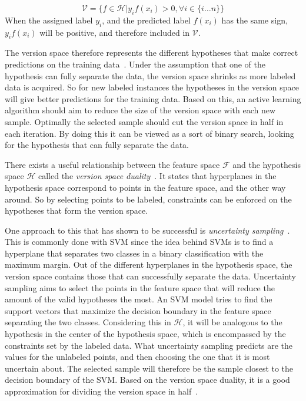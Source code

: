 \begin{equation}\label{eq:version-space}
    \mathcal{V} = \Big \{ f \in \mathcal{H} \Big | y_i f(x_i) > 0, \forall i \in \{i \dots n\} \Big \}
\end{equation}
When the assigned label $y_i$, and the predicted label $f(x_i)$ has the same sign, $y_i f(x_i)$ will be positive, and therefore included in $\mathcal{V}$.

The version space therefore represents the different hypotheses that make correct predictions on the training data~\cite{settles2012active}.
Under the assumption that one of the hypothesis can fully separate the data, the version space shrinks as more labeled data is acquired.
So for new labeled instances the hypotheses in the version space will give better predictions for the training data.
Based on this, an active learning algorithm should aim to reduce the size of the version space with each new sample. 
Optimally the selected sample should cut the version space in half in each iteration.
By doing this it can be viewed as a sort of binary search, looking for the hypothesis that can fully separate the data.

There exists a useful relationship between the feature space $\mathcal{F}$ and the hypothesis space $\mathcal{H}$ called the \textit{version space duality}~\cite{tong2001support, vapnik1998statistical}.
It states that hyperplanes in the hypothesis space correspond to points in the feature space, and the other way around.
So by selecting points to be labeled, constraints can be enforced on the hypotheses that form the version space.

One approach to this that has shown to be successful is \textit{uncertainty sampling}~\cite{settles2012active}.
This is commonly done with SVM since the idea behind SVMs is to find a hyperplane that separates two classes in a binary classification with the maximum margin.
Out of the different hyperplanes in the hypothesis space, the version space contains those that can successfully separate the data.
Uncertainty sampling aims to select the points in the feature space that will reduce the amount of the valid hypotheses the most.
An SVM model tries to find the support vectors that maximize the decision boundary in the feature space separating the two classes.
Considering this in $\mathcal{H}$, it will be analogous to the hypothesis in the center of the hypothesis space, which is encompassed by the constraints set by the labeled data.
What uncertainty sampling predicts are the values for the unlabeled points, and then choosing the one that it is most uncertain about.
The selected sample will therefore be the sample closest to the decision boundary of the SVM.
Based on the version space duality, it is a good approximation for dividing the version space in half~\cite{settles2012active}.

